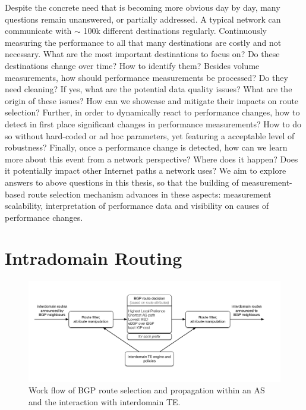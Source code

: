 Despite the concrete need that is becoming more obvious day by day, many questions remain unanswered, or partially addressed.
A typical network can communicate with $\sim$ 100k different destinations regularly. 
Continuously measuring the performance to all that many destinations are costly and not necessary. 
What are the most important destinations to focus on? Do these destinations change over time? How to identify them?
Besides volume measurements, how should performance measurements be processed? Do they need cleaning?
If yes, what are the potential data quality issues? What are the origin of these issues? How can we showcase and mitigate their impacts on route selection?
Further, in order to dynamically react to performance changes, how to detect in first place significant changes in performance measurements? How to do so without hard-coded or ad hoc parameters, yet featuring a acceptable level of robustness?
Finally, once a performance change is detected, how can we learn more about this event from a network perspective? Where does it happen? Does it potentially impact other Internet paths a network uses? 
We aim to explore answers to above questions in this thesis, so that the building of measurement-based route selection mechanism advances in these aspects: measurement scalability, interpretation of performance data and visibility on causes of performance changes. 

\section{Intradomain Routing}
\begin{figure}[!htb]
\centering
\includegraphics[width=1.3\textwidth]{gfx/chap1/bgp_decision.pdf}
\caption{Work flow of \ac{BGP} route selection and propagation within an \ac{AS} and the interaction with interdomain \ac{TE}.}
\label{fig:bgp_decision}
\end{figure}

